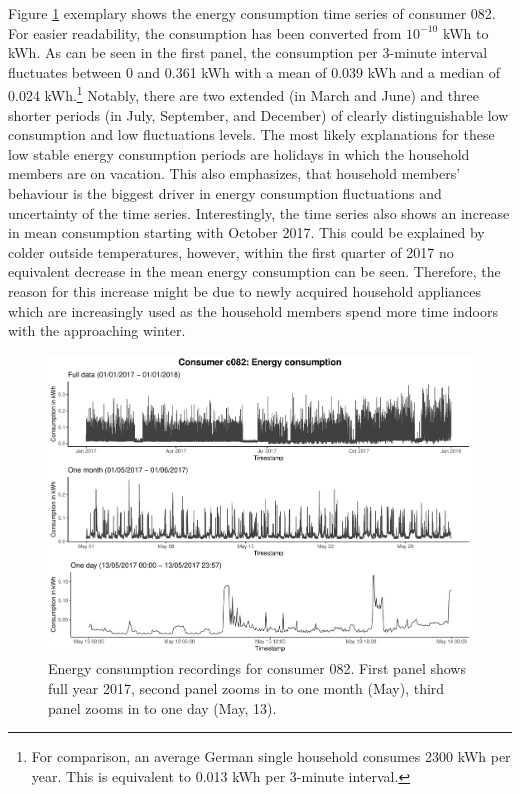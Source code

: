 Figure \ref{Fig:energycons_c082} exemplary shows the energy consumption time series of consumer 082. For easier readability, the consumption has been converted from $10^{-10}$ kWh to kWh. As can be seen in the first panel, the consumption per 3-minute interval fluctuates between 0 and 0.361 kWh with a mean of 0.039 kWh and a median of 0.024 kWh.\footnote{For comparison, an average German single household consumes 2300 kWh per year. This is equivalent to 0.013 kWh per 3-minute interval.} Notably, there are two extended (in March and June) and three shorter periods (in July, September, and December) of clearly distinguishable low consumption and low fluctuations levels. The most likely explanations for these low stable energy consumption periods are holidays in which the household members are on vacation. This also emphasizes, that household members' behaviour is the biggest driver in energy consumption fluctuations and uncertainty of the time series. Interestingly, the time series also shows an increase in mean consumption starting with October 2017. This could be explained by colder outside temperatures, however, within the first quarter of 2017 no equivalent decrease in the mean energy consumption can be seen. Therefore, the reason for this increase might be due to newly acquired household appliances which are increasingly used as the household members spend more time indoors with the approaching winter. 
\begin{figure}[h]
 \centering
\includegraphics[width=\textwidth]{thesis/graphs/timeseries/c082_cons.pdf}
\caption[Energy consumption recordings for consumer 082]{Energy consumption recordings for consumer 082. First panel shows full year 2017, second panel zooms in to one month (May), third panel zooms in to one day (May, 13). \quantnet}
\label{Fig:energycons_c082}
\end{figure}
